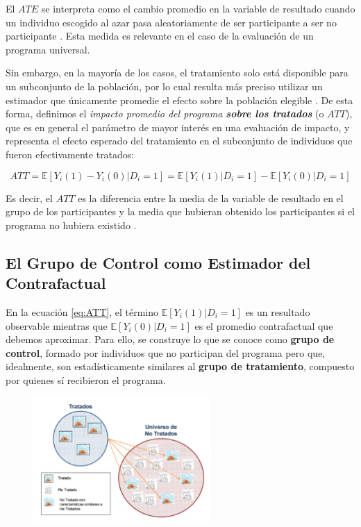 \documentclass[../../main.tex]{subfiles}
\begin{document}
El \(ATE\) se interpreta como el cambio promedio en la variable de resultado cuando un individuo escogido al azar pasa aleatoriamente de ser participante a ser no participante \cite{bernal}. Esta medida es relevante en el caso de la evaluación de un programa universal.

Sin embargo, en la mayoría de los casos, el tratamiento solo está disponible para un subconjunto de la población, por lo cual resulta más preciso utilizar un estimador que únicamente promedie el efecto sobre la población elegible \cite{bernal}. De esta forma, definimos el \textit{impacto promedio del programa \textbf{sobre los tratados}} (o \(ATT\)), que es en general el parámetro de mayor interés en una evaluación de impacto, y representa el efecto esperado del tratamiento en el subconjunto de individuos que fueron efectivamente tratados:

\begin{equation}
    ATT = \mathbb{E} \left[Y_i(1)-Y_i(0)|D_i=1\right] = \mathbb{E} \left[Y_i(1)|D_i=1\right] - \mathbb{E} \left[Y_i(0)|D_i=1\right]
    \label{eq:ATT}
\end{equation}

Es decir, el \(ATT\) es la diferencia entre la media de la variable de resultado en el grupo de los participantes y la media que hubieran obtenido los participantes si el programa no hubiera existido \cite{bernal}.

\subsection{El Grupo de Control como Estimador del Contrafactual}
En la ecuación \ref{eq:ATT}, el término \(\mathbb{E} \left[Y_i(1)|D_i=1\right]\) es un resultado observable mientras que \(\mathbb{E} \left[Y_i(0)|D_i=1\right]\) es el promedio contrafactual que debemos aproximar. Para ello, se construye lo que se conoce como \textbf{grupo de control}, formado por individuos que no participan del programa pero que, idealmente, son estadísticamente similares \cite{gertler-2016} al \textbf{grupo de tratamiento}, compuesto por quienes sí recibieron el programa.

\begin{figure}[h!]
    \centering
    \includegraphics[width=0.6\textwidth]{figs/grupo-de-control.png}
    \caption{}
    \label{fig:control-group}
\end{figure}
\end{document}
